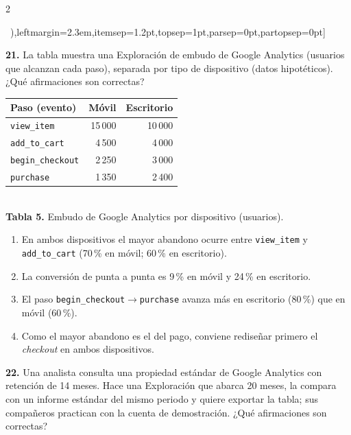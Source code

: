 \documentclass[10pt,letterpaper]{article}
\newcommand{\cas}{\framebox[1.0em]{\rule{0pt}{1.05ex}}}
\begin{document}
\begin{multicols}{2}
\begin{minipage}[t]{\columnwidth}
\begin{enumerate}[label=\cas\ \alph*),leftmargin=2.3em,itemsep=1.2pt,topsep=1pt,parsep=0pt,partopsep=0pt]
\end{enumerate}\end{minipage}\par\vspace{3pt}
\begin{minipage}[t]{\columnwidth}\noindent\textbf{21.} La tabla muestra una Exploración de embudo de Google Analytics (usuarios que alcanzan cada paso), separada por tipo de dispositivo (datos hipotéticos). ¿Qué afirmaciones son correctas?
\begin{center}{\scriptsize\renewcommand{\arraystretch}{1.05}\begin{tabular}{@{}lrr@{}}\toprule
Paso (evento) & Móvil & Escritorio\\\midrule
\texttt{view\_item} & 15\,000 & 10\,000\\ \texttt{add\_to\_cart} & 4\,500 & 4\,000\\ \texttt{begin\_checkout} & 2\,250 & 3\,000\\ \texttt{purchase} & 1\,350 & 2\,400\\\bottomrule\end{tabular}}\\[1pt]{\tiny\textbf{Tabla 5.} Embudo de Google Analytics por dispositivo (usuarios).}\end{center}
\vspace{1pt}\begin{enumerate}[label=\cas\ \alph*),leftmargin=2.3em,itemsep=1.2pt,topsep=1pt,parsep=0pt,partopsep=0pt]
\item En ambos dispositivos el mayor abandono ocurre entre \texttt{view\_item} y \texttt{add\_to\_cart} (70\,\% en móvil; 60\,\% en escritorio).
\item La conversión de punta a punta es 9\,\% en móvil y 24\,\% en escritorio.
\item El paso \texttt{begin\_checkout}$\to$\texttt{purchase} avanza más en escritorio (80\,\%) que en móvil (60\,\%).
\item Como el mayor abandono es el del pago, conviene rediseñar primero el \textit{checkout} en ambos dispositivos.
\end{enumerate}\end{minipage}\par\vspace{3pt}
\begin{minipage}[t]{\columnwidth}\noindent\textbf{22.} Una analista consulta una propiedad estándar de Google Analytics con retención de 14 meses. Hace una Exploración que abarca 20 meses, la compara con un informe estándar del mismo periodo y quiere exportar la tabla; sus compañeros practican con la cuenta de demostración. ¿Qué afirmaciones son correctas?

\end{minipage}
\end{multicols}
\end{document}
